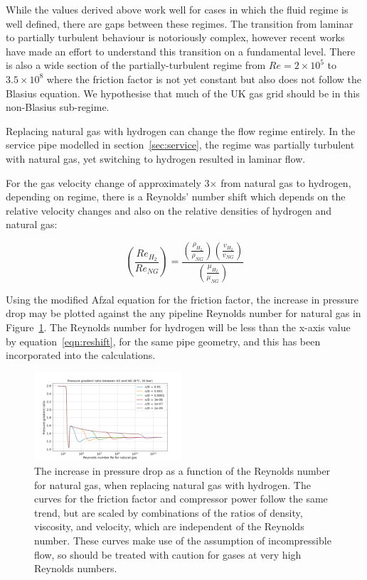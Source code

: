 \documentclass[5p]{elsarticle} %
\begin{document}
While the values derived above work well for cases in which the fluid regime is well defined, there are gaps between these regimes. 
The transition from laminar to partially turbulent behaviour is notoriously complex, however recent works have made an effort to understand this transition on a fundamental level\citep{Goldenfeld2006, She2012}.
There is also a wide section of the partially-turbulent regime from $Re = 2\times10^5$ to $3.5\times10^8$ where the friction factor is not yet constant but also does not follow the Blasius equation.
We hypothesise that much of the UK gas grid should be in this non-Blasius sub-regime.

Replacing natural gas with hydrogen can change the flow regime entirely.
In the service pipe modelled in section~\ref{sec:service}, the regime was partially turbulent with natural gas, yet switching to hydrogen resulted in laminar flow.

For the  gas velocity change of approximately 3$\times$ from natural gas to hydrogen, depending on regime, there is a Reynolds' number shift which depends on the relative velocity changes and also on the relative densities of hydrogen and natural gas:

\begin{equation}
\label{eqn:reshift}
    \left(\frac{Re_{H_2}}{Re_{NG}}\right) = 
    \frac{
        \left(\frac{\rho_{H_2}}{\rho_{NG}}\right)
        \left(\frac{v_{H_2}}{v_{NG}}\right)
    }{
        \left(\frac{\mu_{H_2}}{\mu_{NG}}\right)
    }
\end{equation}

Using the modified Afzal equation for the friction factor, the increase in pressure drop may be plotted against the any pipeline Reynolds number for natural gas in Figure~\ref{fig:pressuredrop}.
The Reynolds number for hydrogen will be less than the x-axis value by equation~\eqref{eqn:reshift}, for the same pipe geometry, and this has been incorporated into the calculations. 

\begin{figure}[htb]
\centering
\includegraphics[width=0.49\textwidth]{p2_h2_ratio.png}
\caption{The increase in pressure drop as a function of the Reynolds number for natural gas, when replacing natural gas with hydrogen. The curves for the friction factor and compressor power follow the same trend, but are scaled by combinations of the ratios of density, viscosity, and velocity, which are independent of the Reynolds number. These curves make use of the assumption of incompressible flow, so should be treated with caution for gases at very high Reynolds numbers.}
\label{fig:pressuredrop}
\end{figure}
\end{document}
